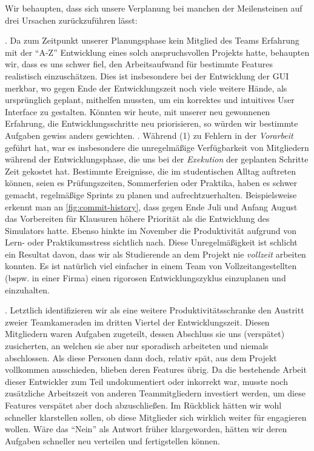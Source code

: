 \pagebreak
Wir behaupten, dass sich unsere Verplanung bei manchen der Meilensteinen auf drei Ursachen zurückzuführen lässt:

\begin{enumerate}

  . Da zum Zeitpunkt
  unserer Planungsphase kein Mitglied des Teams Erfahrung mit der ``A-Z''
  Entwicklung eines solch anspruchsvollen Projekts hatte, behaupten wir, dass es
  uns schwer fiel, den Arbeitsaufwand für bestimmte Features realistisch
  einzuschätzen. Dies ist insbesondere bei der Entwicklung der GUI merkbar, wo
  gegen Ende der Entwicklungszeit noch viele weitere Hände, als ursprünglich
  geplant, mithelfen mussten, um ein korrektes und intuitives User Interface zu
  gestalten. Könnten wir heute, mit unserer neu gewonnenen Erfahrung, die
  Entwicklungsschritte neu priorisieren, so würden wir bestimmte Aufgaben gewiss
  anders gewichten. . Während (1) zu Fehlern
  in der \emph{Vorarbeit} geführt hat, war es insbesondere die unregelmäßige
  Verfügbarkeit von Mitgliedern während der Entwicklungsphase, die uns bei der
  \emph{Exekution} der geplanten Schritte Zeit gekostet hat. Bestimmte
  Ereignisse, die im studentischen Alltag auftreten können, seien es
  Prüfungszeiten, Sommerferien oder Praktika, haben es schwer gemacht,
  regelmäßige Sprints zu planen und aufrechtzuerhalten. Beispielsweise erkennt
  man an \autoref{fig:commit-history}, dass gegen Ende Juli und Anfang August
  das Vorbereiten für Klausuren höhere Priorität als die Entwicklung des
  Simulators hatte. Ebenso hinkte im November die Produktivität aufgrund von
  Lern- oder Praktikumsstress sichtlich nach. Diese Unregelmäßigkeit ist
  schlicht ein Resultat davon, dass wir als Studierende an dem Projekt nie
  \emph{vollzeit} arbeiten konnten. Es ist natürlich viel einfacher in einem
  Team von Vollzeitangestellten (bspw. in einer Firma) einen rigorosen
  Entwicklungszyklus einzuplanen und einzuhalten.

  . Letztlich identifizieren wir als eine
  weitere Produktivitätsschranke den Austritt zweier Teamkameraden im dritten
  Viertel der Entwicklungszeit. Diesen Mitgliedern waren Aufgaben zugeteilt,
  dessen Abschluss sie uns (verspätet) zusicherten, an welchen sie aber nur
  sporadisch arbeiteten und niemals abschlossen. Als diese Personen dann doch,
  relativ spät, aus dem Projekt vollkommen ausschieden, blieben deren Features
  übrig. Da die bestehende Arbeit dieser Entwickler zum Teil undokumentiert oder
  inkorrekt war, musste noch zusätzliche Arbeitszeit von anderen Teammitgliedern
  investiert werden, um diese Features verspätet aber doch abzuschließen. Im Rückblick hätten wir wohl schneller klarstellen sollen, ob diese Mitglieder sich wirklich weiter für \erasim{} engagieren wollen. Wäre das ``Nein'' als Antwort früher klargeworden, hätten wir deren Aufgaben schneller neu verteilen und fertigstellen können.

\end{enumerate}

